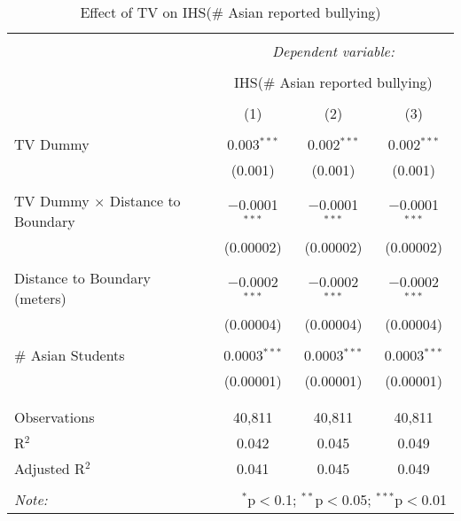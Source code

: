 
\begin{table}[!htbp] \centering 
  \caption{Effect of TV on IHS(\# Asian reported bullying)} 
  \label{} 
\begin{tabular}{@{\extracolsep{-2pt}}lccc} 
\\[-1.8ex]\hline 
\hline \\[-1.8ex] 
 & \multicolumn{3}{c}{\textit{Dependent variable:}} \\ 
\cline{2-4} 
\\[-1.8ex] & \multicolumn{3}{c}{IHS(\# Asian reported bullying)} \\ 
\\[-1.8ex] & (1) & (2) & (3)\\ 
\hline \\[-1.8ex] 
 TV Dummy & 0.003$^{***}$ & 0.002$^{***}$ & 0.002$^{***}$ \\ 
  & (0.001) & (0.001) & (0.001) \\ 
  & & & \\ 
 TV Dummy $\times$ Distance to Boundary & $-$0.0001$^{***}$ & $-$0.0001$^{***}$ & $-$0.0001$^{***}$ \\ 
  & (0.00002) & (0.00002) & (0.00002) \\ 
  & & & \\ 
 Distance to Boundary (meters) & $-$0.0002$^{***}$ & $-$0.0002$^{***}$ & $-$0.0002$^{***}$ \\ 
  & (0.00004) & (0.00004) & (0.00004) \\ 
  & & & \\ 
 \# Asian Students & 0.0003$^{***}$ & 0.0003$^{***}$ & 0.0003$^{***}$ \\ 
  & (0.00001) & (0.00001) & (0.00001) \\ 
  & & & \\ 
\hline \\[-1.8ex] 
Observations & 40,811 & 40,811 & 40,811 \\ 
R$^{2}$ & 0.042 & 0.045 & 0.049 \\ 
Adjusted R$^{2}$ & 0.041 & 0.045 & 0.049 \\ 
\hline 
\hline \\[-1.8ex] 
\textit{Note:}  & \multicolumn{3}{r}{$^{*}$p$<$0.1; $^{**}$p$<$0.05; $^{***}$p$<$0.01} \\ 
\end{tabular} 
\end{table} 
